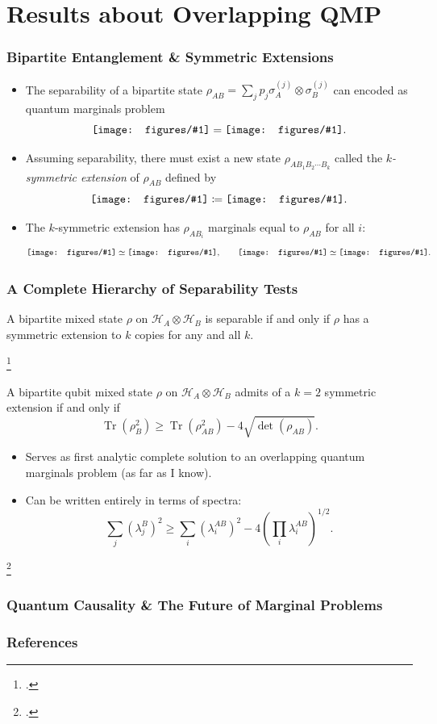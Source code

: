 \documentclass[
    9pt,
    hyperref={bookmarks=false, colorlinks=false}, %
    xcolor={dvipsnames},
]{beamer}
\DeclareMathOperator{\Tr}{Tr}
\newcommand{\incstr}[1]{\vcenter{\hbox{\texttt{[image: figures/\#1]}}}} %
\begin{document}
\section{Results about Overlapping QMP}
\begin{frame}
    \frametitle{Bipartite Entanglement \& Symmetric Extensions}
    \begin{itemize}
        \item The separability of a bipartite state $\rho_{AB} = {\sum}_{j} p_j \sigma_A^{(j)}\otimes \sigma_B^{(j)}$ can encoded as quantum marginals problem
            \[ \incstr{bipartite.pdf} = \incstr{sep_class_wire.pdf} .\]
        \item Assuming separability, there must exist a new state $\rho_{AB_1B_2\cdots B_k}$ called the \textit{$k$-symmetric extension} of $\rho_{AB}$ defined by
            \[ \incstr{kpartite.pdf} \coloneqq \incstr{sep_ext_k.pdf}. \]
        \item The $k$-symmetric extension has $\rho_{AB_i}$ marginals equal to $\rho_{AB}$ for all $i$:
            \[ \incstr{bipartite.pdf} \simeq \incstr{kpartite_marg.pdf}, \qquad \incstr{kpartite.pdf} \simeq \incstr{kpartite_sym.pdf}. \]
    \end{itemize}
\end{frame}

\begin{frame}
    \frametitle{A Complete Hierarchy of Separability Tests}
    \begin{theorem}
        A bipartite mixed state $\rho$ on $\mathcal H_A \otimes \mathcal H_B$ is separable if and only if $\rho$ has a symmetric extension to $k$ copies for any and all $k$.
    \end{theorem}
    \footcitetext{doherty2004complete}
    \begin{theorem}
        A bipartite qubit mixed state $\rho$ on $\mathcal H_A \otimes \mathcal H_B$ admits of a $k=2$ symmetric extension if and only if
        \[ \Tr(\rho_{B}^2) \geq \Tr(\rho^2_{AB}) - 4 \sqrt{\det(\rho_{AB})}. \]
    \end{theorem}
    \begin{itemize}
        \item Serves as first analytic complete solution to an overlapping quantum marginals problem (as far as I know).
        \item Can be written entirely in terms of spectra:
        \[ {\sum}_{j}(\lambda_j^{B})^2 \geq {\sum}_{i}(\lambda_i^{AB})^2 - 4 \left({\prod}_{i} \lambda_i^{AB}\right)^{1/2}. \]
    \end{itemize}
    \footcitetext{chen2014symmetric}
\end{frame}

\begin{frame}
    \frametitle{Quantum Causality \& The Future of Marginal Problems}
\end{frame}

\begin{frame}[allowframebreaks]
    \frametitle{References}
    \printbibliography
\end{frame}
\end{document}
